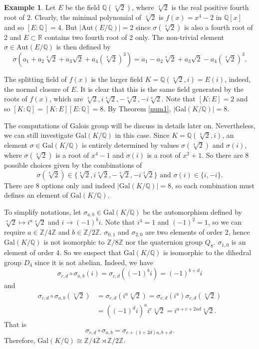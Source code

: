\documentclass[12pt]{report}
\theoremstyle{definition}
\newtheorem{example}[thm]{Example}
\def\ZZ{\mathbb{Z}}
\def\QQ{\mathbb{Q}}
\def\RR{\mathbb{R}}
\def\Aut{\text{Aut}}
\def\Gal{\text{Gal}}
\begin{document}
\begin{example}
    Let $E$ be the field $\QQ(\sqrt[4]{2})$, where $\sqrt[4]{2}$ is the real positive fourth root of $2$. Clearly, the minimal polynomial of $\sqrt[4]{2}$ is $f(x)=x^4-2$ in $\QQ[x]$ and so $[E:\QQ]=4$. But $|\Aut(E/\QQ)|=2$ since $\sigma(\sqrt[4]{2})$ is also a fourth root of 2 and $E\subset \RR$ contains two fourth root of 2 only. The non-trivial element $\sigma\in\Aut(E/\QQ)$ is then defined by $$\sigma(a_1+a_2\sqrt[4]{2} +a_3\sqrt{2} +a_4 (\sqrt[4]{2})^3) =a_1-a_2\sqrt[4]{2} +a_3\sqrt{2} -a_4 (\sqrt[4]{2})^3.$$


    The splitting field of $f(x)$ is the larger field $K=\QQ(\sqrt[4]{2},i)=E(i)$, indeed, the normal closure of $E$. It is clear that this is the same field generated by the roots of $f(x)$, which are $\sqrt[4]{2},i\sqrt[4]{2},-\sqrt[4]{2},-i\sqrt[4]{2}$. Note that $[K:E]=2$ and so $[K:\QQ]=[K:E][E:\QQ]=8$. By Theorem \ref{num1}, $|\Gal(K/\QQ)|=8$.

    The computations of Galois group will be discuss in details later on. Nevertheless, we can still investigate $\Gal(K/\QQ)$ in this case. Since $K=\QQ(\sqrt[4]{2},i)$, an element $\sigma\in \Gal(K/\QQ)$ is entirely determined by values $\sigma(\sqrt[4]{2})$ and $\sigma(i)$, where $\sigma(\sqrt[4]{2})$ is a root of $x^4-1$ and $\sigma(i)$ is a root of $x^2+1$. So there are 8 possible choices given by the combinations of $$\sigma(\sqrt[4]{2})\in\{\sqrt[4]{2},i\sqrt[4]{2},-\sqrt[4]{2},-i\sqrt[4]{2}\}\mbox{ and }\sigma(i)\in\{i,-i\}.$$
    There are 8 options only and indeed $|\Gal(K/\QQ)|=8$, so each combination must defines an element of $\Gal(K/\QQ)$. 
    
    To simplify notations, let $\sigma_{a,b}\in \Gal(K/\QQ)$ be the automorphism defined by $\sqrt[4]{2}\mapsto i^a \sqrt[4]{2}$ and $i\to (-1)^bi$. Note that $i^4=1$ and $(-1)^2=1$, so we can require $a\in\ZZ/4\ZZ$ and $b\in \ZZ/2\ZZ$. $\sigma_{0,1}$ and $\sigma_{2,0}$ are two elements of order 2, hence $\Gal(K/\QQ)$ is not isomorphic to $\ZZ/8\ZZ$ nor the quaternion group $Q_8$. $\sigma_{1,0}$ is an element of order 4. So we suspect that $\Gal(K/\QQ)$ is isomorphic to the dihedral group $D_4$ since it is not abelian. Indeed, we have $$\sigma_{c,d}\circ\sigma_{a,b}(i) = \sigma_{c,d}((-1)^b i) = (-1)^{b+d} i$$
    and \begin{align*}
        \sigma_{c,d}\circ\sigma_{a,b}(\sqrt[4]{2}) &= \sigma_{c,d}(i^a \sqrt[4]{2}) =  \sigma_{c,d}(i^a)\sigma_{c,d}(\sqrt[4]{2}) \\
        &= ((-1)^d i)^a i^c\sqrt[4]{2} = i^{a+c+2ad} \sqrt[4]{2}.
    \end{align*}
    That is $$\sigma_{c,d}\circ\sigma_{a,b} = \sigma_{c+(1+2d)a,b+d}.$$ Therefore, $\Gal(K/\QQ) \cong \ZZ/4\ZZ \rtimes \ZZ/2\ZZ.$
\end{example}
\end{document}
